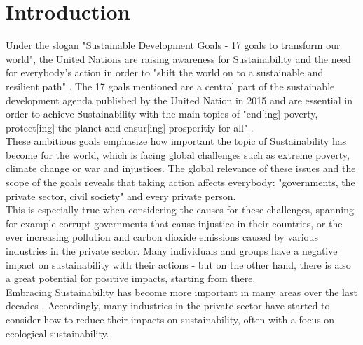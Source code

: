 \documentclass[oribibl]{llncs}
\begin{document}
\section{Introduction}
Under the slogan "Sustainable Development Goals - 17 goals to transform our world"\cite{nino_sustainable_2017}, the United Nations are raising awareness for Sustainability and the need for everybody's action in order to "shift the world on to a sustainable and resilient path" \cite{UN_transform_15}%
. The 17 goals mentioned are a central part of the sustainable development agenda published by the United Nation in 2015 \cite{UN_transform_15} and are essential in order to achieve Sustainability with the main topics of "end[ing] poverty, protect[ing] the planet and ensur[ing] prosperitiy for all" \cite{nino_sustainable_2017}.\\
These ambitious goals emphasize how important the topic of Sustainability has become for the world, which is facing global challenges such as extreme poverty, climate change or war and injustices. The global relevance of these issues and the scope of the goals reveals that taking action affects everybody: "governments, the private sector, civil society"\cite{nino_sustainable_2017} and every private person.\\
This is especially true when considering the causes for these challenges, spanning for example corrupt governments that cause injustice in their countries, or the ever increasing pollution and carbon dioxide emissions caused by various industries in the private sector. Many individuals and groups %
have a negative impact on sustainability with their actions - but on the other hand, there is also a great potential for positive impacts, starting from there.\\
Embracing Sustainability has become more important in many areas over the last decades %
. Accordingly, many industries in the private sector have started to consider how to reduce their impacts on sustainability, often with a focus on ecological sustainability. %
\end{document}
